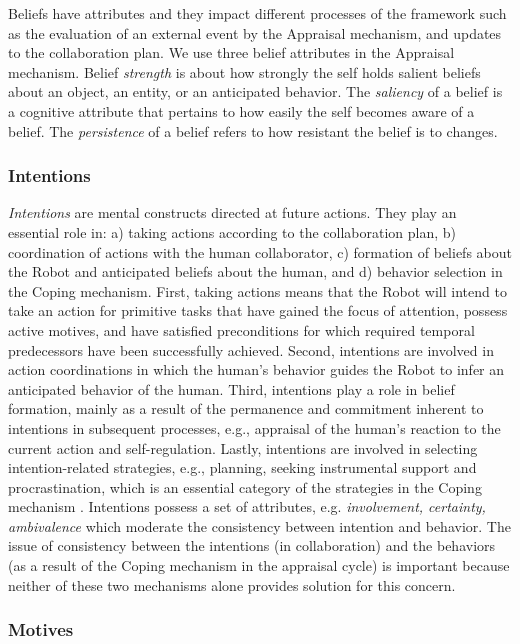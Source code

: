Beliefs have attributes and they impact different processes of the framework
such as the evaluation of an external event by the Appraisal mechanism, and
updates to the collaboration plan. We use three belief attributes in the Appraisal mechanism.
Belief \textit{strength} is about how strongly the self holds salient beliefs
about an object, an entity, or an anticipated behavior. The \textit{saliency} of
a belief is a cognitive attribute that pertains to how easily the self becomes
aware of a belief. The \textit{persistence} of a belief refers to how resistant
the belief is to changes.

\subsubsection{Intentions}
\label{sec:intentions}

\textit{Intentions} are mental constructs directed at future actions. They play
an essential role in: a) taking actions according to the collaboration plan, b)
coordination of actions with the human collaborator, c) formation of beliefs
about the Robot and anticipated beliefs about the human, and d) behavior
selection in the Coping mechanism. First, taking actions means that the Robot
will intend to take an action for primitive tasks that have gained the focus of
attention, possess active motives, and have satisfied preconditions for which
required temporal predecessors have been successfully achieved. Second,
intentions are involved in action coordinations in which the human's behavior
guides the Robot to infer an anticipated behavior of the human. Third,
intentions play a role in belief formation, mainly as a result of the permanence
and commitment inherent to intentions in subsequent processes, e.g., appraisal
of the human's reaction to the current action and self-regulation. Lastly,
intentions are involved in selecting intention-related strategies, e.g.,
planning, seeking instrumental support and procrastination, which is an
essential category of the strategies in the Coping mechanism
\cite{marsella:ema-process-model}. Intentions possess a set of attributes, e.g.
\textit{involvement, certainty, ambivalence} which moderate the consistency
between intention and behavior. The issue of consistency between the intentions
(in collaboration) and the behaviors (as a result of the Coping mechanism in the
appraisal cycle) is important because neither of these two mechanisms alone
provides solution for this concern.

\subsubsection{Motives}
\label{sec:motives}

